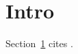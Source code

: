 \documentclass{article}
\begin{document}
\section{Intro}\label{sec:intro}
Section~\ref{sec:intro} cites \cite{knuth84}.


\end{document}
